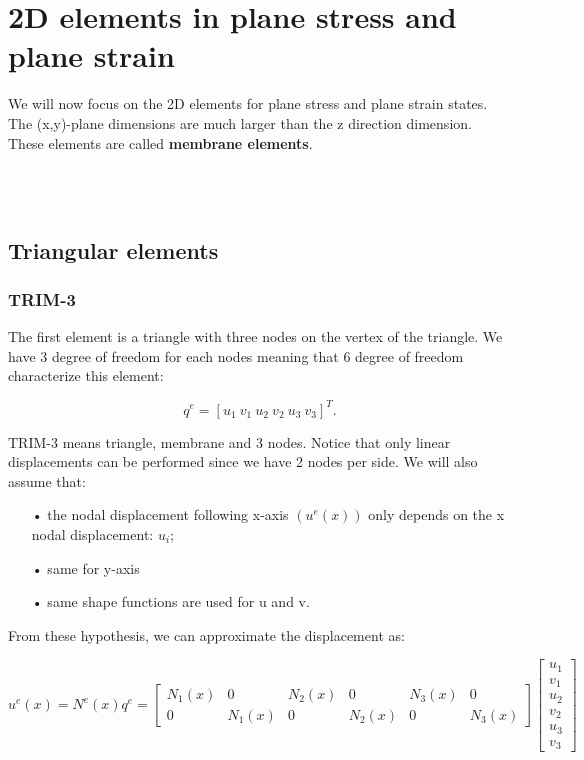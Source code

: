 
\chapter{2D elements in plane stress and plane strain}
\label{chap:8}
	We will now focus on the 2D elements for plane stress and plane strain states. The (x,y)-plane dimensions are much larger than the z direction dimension. These elements are called \textbf{membrane elements}.
	
	\ \\\\
	
\section{Triangular elements}
\subsection{TRIM-3}
	The first element is a triangle with three nodes on the vertex of the triangle. We have 3 degree of freedom for each nodes meaning that 6 degree of freedom characterize this element: 
	
	\begin{equation}
	q^e = [u_1 \  v_1 \ u_2 \  v_2 \ u_3 \  v_3]^T.
	\end{equation}
	
	TRIM-3 means triangle, membrane and 3 nodes. Notice that only linear displacements can be performed since we have 2 nodes per side. We will also assume that: 
	
	\begin{itemize}
	\item[•] the nodal displacement following x-axis $(u^e(x))$ only depends on the x nodal displacement: $u_i$;
	
	\item[•] same for y-axis
	
	\item[•] same shape functions are used for u and v. 
	\end{itemize}
	
	From these hypothesis, we can approximate the displacement as:
	
	\begin{equation}
	u^e(x) = N^e(x) q^e = \left[
	\begin{array}{cccccc}
	N_1(x) & 0 & N_2(x) & 0 & N_3(x) & 0\\
	0 & N_1(x) & 0 & N_2(x) & 0 & N_3(x)
	\end{array}
	\right]
	\left[
	\begin{array}{c}
	u_1\\
	v_1\\
	u_2\\
	v_2\\
	u_3\\
	v_3
	\end{array}
	\right]
	\end{equation}
	
